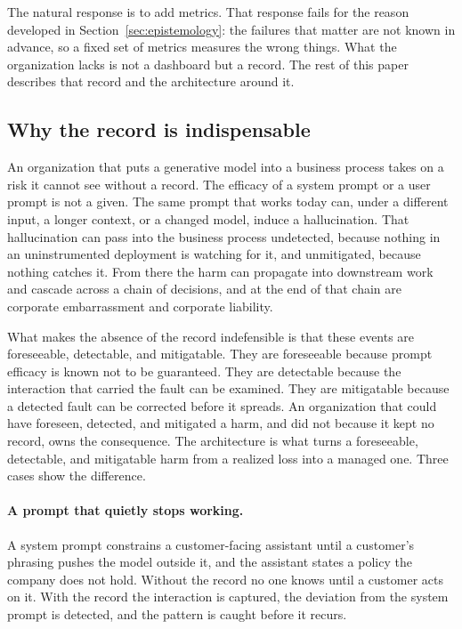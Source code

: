 \documentclass[11pt]{article}
\begin{document}
The natural response is to add metrics. That response fails for the reason
developed in Section~\ref{sec:epistemology}: the failures that matter are not
known in advance, so a fixed set of metrics measures the wrong things. What the
organization lacks is not a dashboard but a record. The rest of this paper
describes that record and the architecture around it.

\subsection{Why the record is indispensable}

An organization that puts a generative model into a business process takes on a
risk it cannot see without a record. The efficacy of a system prompt or a user
prompt is not a given. The same prompt that works today can, under a different
input, a longer context, or a changed model, induce a hallucination. That
hallucination can pass into the business process undetected, because nothing in an
uninstrumented deployment is watching for it, and unmitigated, because nothing
catches it. From there the harm can propagate into downstream work and cascade
across a chain of decisions, and at the end of that chain are corporate
embarrassment and corporate liability.

What makes the absence of the record indefensible is that these events are
foreseeable, detectable, and mitigatable. They are foreseeable because prompt
efficacy is known not to be guaranteed. They are detectable because the
interaction that carried the fault can be examined. They are mitigatable because a
detected fault can be corrected before it spreads. An organization that could have
foreseen, detected, and mitigated a harm, and did not because it kept no record,
owns the consequence. The architecture is what turns a foreseeable, detectable,
and mitigatable harm from a realized loss into a managed one. Three cases show the
difference.

\paragraph{A prompt that quietly stops working.} A system prompt constrains a
customer-facing assistant until a customer's phrasing pushes the model outside it,
and the assistant states a policy the company does not hold. Without the record no
one knows until a customer acts on it. With the record the interaction is
captured, the deviation from the system prompt is detected, and the pattern is
caught before it recurs.
\end{document}
